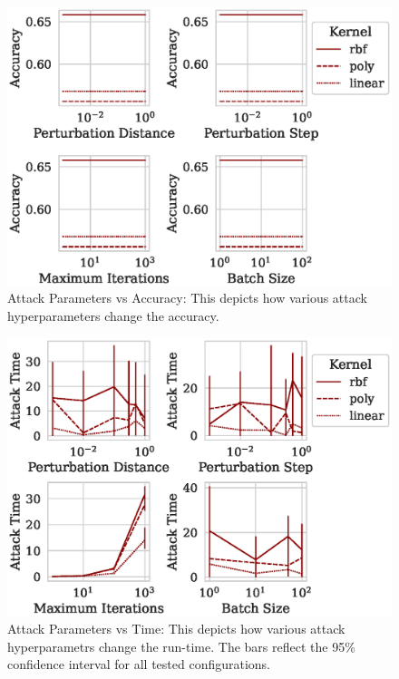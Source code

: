 \documentclass[fonts]{icst}
\begin{document}
\begin{figure}[!htb]
  \centering
  \includegraphics[width=.75\textwidth]{./generated/accuracy_vs_attack_parameters.eps}
   \caption{Attack Parameters vs Accuracy: This depicts how various attack hyperparameters change the accuracy.
   }
   \label{fig:attack_accuracy}
\end{figure}


\begin{figure}
    \centering
    \includegraphics[width=.75\textwidth]{./generated/train_time_vs_attack_parameters.eps}
    \caption{Attack Parameters vs Time: This depicts how various attack hyperparametrs change the run-time.  The bars reflect the 95\% confidence interval for all tested configurations.}
    \label{fig:attack_time}
\end{figure}
\end{document}
